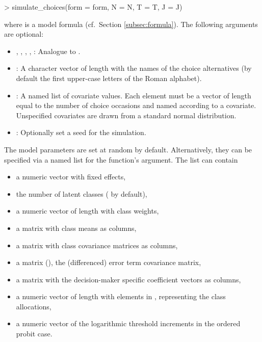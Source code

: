 \documentclass[article,shortnames]{jss}
\newcommand{\fct}[1]{\code{#1()}}
\begin{document}
\begin{Schunk}
\begin{Sinput}
> simulate_choices(form = form, N = N, T = T, J = J)
\end{Sinput}
\end{Schunk}

where  is a model formula (cf.\ Section \ref{subsec:formula}). The following arguments are optional:
\begin{itemize}
  \item {}, , , , : Analogue to \fct{prepare\_data}.
  \item {}: A character vector of length  with the names of the choice alternatives (by default the first  upper-case letters of the Roman alphabet).
  \item {}: A named list of covariate values. Each element must be a vector of length equal to the number of choice occasions and named according to a covariate. Unspecified covariates are drawn from a standard normal distribution.
  \item {}: Optionally set a seed for the simulation.
\end{itemize}

The model parameters are set at random by default. Alternatively, they can be specified via a named list for the function's  argument. The list can contain
\begin{itemize}
  \item a numeric vector  with fixed effects,
  \item the number  of latent classes ( by default),
  \item a numeric vector  of length  with class weights,
  \item a matrix  with class means as columns,
  \item a matrix  with class covariance matrices as columns,
  \item a matrix  (), the (differenced) error term covariance matrix,
  \item a matrix  with the decision-maker specific coefficient vectors as columns,
  \item a numeric vector  of length  with elements in , representing the class allocations,
  \item a numeric vector  of the logarithmic threshold increments in the ordered probit case.
\end{itemize}
\end{document}
